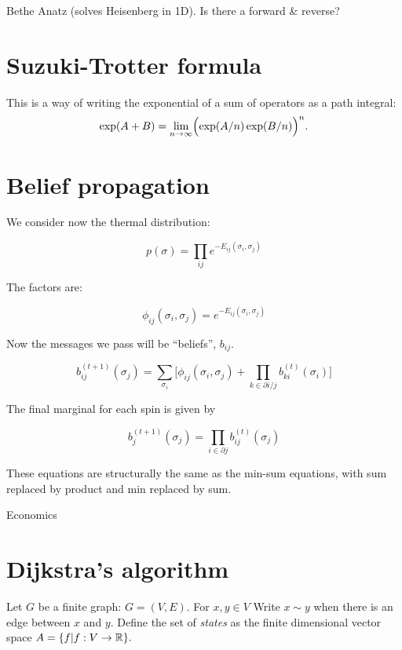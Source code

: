 \documentclass[11pt]{article}
\begin{document}
Bethe Anatz (solves Heisenberg in 1D). 
Is there a forward \& reverse?

\section{Suzuki-Trotter formula}

This is a way of writing the exponential of a sum of operators
as a path integral:
$$
\exp(A+B) = \lim_{n\to\infty} \Bigl(\exp(A/n)\exp(B/n)\Bigr)^n.
$$
 

\section{Belief propagation}



We consider now the thermal distribution:

$$
    p(\sigma) = \prod_{ij} e^{-E_{ij}(\sigma_i, \sigma_j)}
$$

The factors are:

$$
\phi_{ij}(\sigma_i, \sigma_j) = e^{-E_{ij}(\sigma_i, \sigma_j)}
$$

Now the messages we pass will be ``beliefs'', $b_{ij}$.

$$
b_{ij}^{(t+1)}(\sigma_j) = \sum_{\sigma_i}\bigl[ \phi_{ij}(\sigma_i, \sigma_j)
  + \prod_{k\in \partial i/j} b_{ki}^{(t)}(\sigma_i) \bigr]
$$

The final marginal for each spin is given by

$$
    b_j^{(t+1)}(\sigma_j) = \prod_{i\in \partial j} b_{ij}^{(t)}(\sigma_j)
$$

These equations are structurally the same as the
min-sum equations, with sum replaced by product and
min replaced by sum.




Economics


%
%

\section{Dijkstra's algorithm}

Let $G$ be a finite graph: $G = (V, E).$
For $x,y\in V$ Write $x\sim y$ when there
is an edge between $x$ and $y.$ %
Define the set of \emph{states} as %
the finite dimensional vector space
$A = \{ f | f : V \to \mathbb R \}.$
\end{document}
